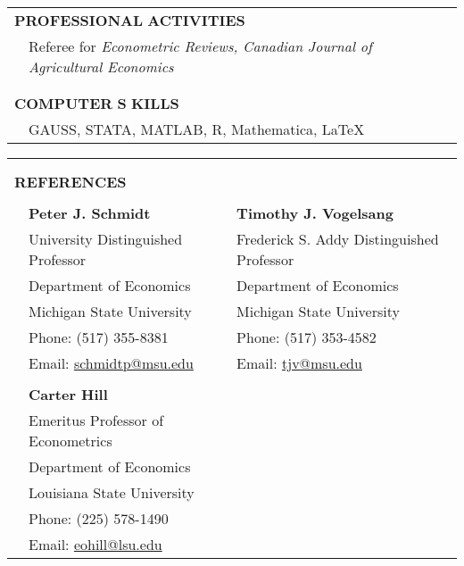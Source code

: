 \documentclass[10pt]{article}
\begin{document}
\begin{center}
\begin{tabular}{lllr}
\multicolumn{4}{l}{{\Large \textbf{P}}\textbf{ROFESSIONAL} {\Large \textbf{A}}\textbf{CTIVITIES}}\\
& \multicolumn{3}{l}{Referee for \emph{Econometric Reviews, Canadian Journal of Agricultural Economics}}\\
\multicolumn{4}{l}{}\\\\
\multicolumn{4}{l}{{\Large \textbf{C}}\textbf{OMPUTER} {\Large \textbf{S}}%
\textbf{KILLS}}  \\
&\multicolumn{3}{l}{GAUSS, STATA, MATLAB, R, Mathematica, \LaTeX}\\
\end{tabular}
%
\begin{tabular}{llllr}
\multicolumn{5}{l}{}\\\\
\multicolumn{5}{l}{{\Large \textbf{R}}\textbf{EFERENCES}}\\
\multicolumn{1}{p{20pt}}{}&\multicolumn{1}{p{100pt}}{}&\multicolumn{1}{p{80pt}}{}&\multicolumn{1}{p{100pt}}{}&\multicolumn{1}{p{140pt}}{}\\
\multicolumn{1}{p{10pt}}{}&\multicolumn{2}{l}{\textbf{Peter J. Schmidt}} & \multicolumn{2}{l}{\textbf{Timothy J. Vogelsang}} \\
&\multicolumn{2}{l}{University Distinguished Professor} &\multicolumn{2}{l}{Frederick S. Addy Distinguished Professor} \\
&\multicolumn{2}{l}{Department of Economics} &\multicolumn{2}{l}{Department of Economics} \\
&\multicolumn{2}{l}{Michigan State University} &\multicolumn{2}{l}{Michigan State University}\\
&\multicolumn{2}{l}{Phone: (517) 355-8381}&\multicolumn{2}{l}{Phone: (517) 353-4582} \\
&\multicolumn{2}{l}{Email:  \href{mailto:schmidtp@msu.edu}{schmidtp@msu.edu}}&\multicolumn{2}{l}{Email: \href{mailto:tjv@msu.edu}{tjv@msu.edu}}\\ 
\multicolumn{5}{l}{}\\
& \multicolumn{2}{l}{\textbf{Carter Hill}}&\multicolumn{2}{l}{}\\
&\multicolumn{2}{l}{Emeritus Professor of Econometrics}&\multicolumn{2}{l}{}\\
& \multicolumn{2}{l}{Department of Economics}&\multicolumn{2}{l}{}\\
&\multicolumn{2}{l}{Louisiana State University}&\multicolumn{2}{l}{}\\
&\multicolumn{2}{l}{Phone: (225) 578-1490}&\multicolumn{2}{l}{}\\
&\multicolumn{2}{l}{Email:  \href{mailto:eohill@lsu.edu}{eohill@lsu.edu}}&\multicolumn{2}{l}{}
\end{tabular}

\end{center}
\end{document}
